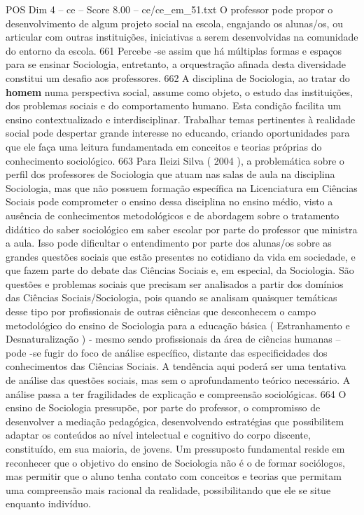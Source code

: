 \begin{textsample}{POS Dim 4 – ce – Score 8.00 – ce/ce\_em\_51.txt}
O professor pode propor o desenvolvimento de algum projeto social na escola, engajando os alunas/os, ou articular com outras instituições, iniciativas a serem desenvolvidas na comunidade do entorno da escola. 661 Percebe -se assim que há múltiplas formas e espaços para se ensinar Sociologia, entretanto, a orquestração afinada desta diversidade constitui um desafio aos professores. 662 A disciplina de Sociologia, ao tratar do \textbf{homem} numa perspectiva social, assume como objeto, o estudo das instituições, dos problemas sociais e do comportamento humano.
Esta condição facilita um ensino contextualizado e interdisciplinar.
Trabalhar temas pertinentes à realidade social pode despertar grande interesse no educando, criando oportunidades para que ele faça uma leitura fundamentada em conceitos e teorias próprias do conhecimento sociológico. 663 Para Ileizi Silva ( 2004 ), a problemática sobre o perfil dos professores de Sociologia que atuam nas salas de aula na disciplina Sociologia, mas que não possuem formação específica na Licenciatura em Ciências Sociais pode comprometer o ensino dessa disciplina no ensino médio, visto a ausência de conhecimentos metodológicos e de abordagem sobre o tratamento didático do saber sociológico em saber escolar por parte do professor que ministra a aula.
Isso pode dificultar o entendimento por parte dos alunas/os sobre as grandes questões sociais que estão presentes no cotidiano da vida em sociedade, e que fazem parte do debate das Ciências Sociais e, em especial, da Sociologia.
São questões e problemas sociais que precisam ser analisados a partir dos domínios das Ciências Sociais/Sociologia, pois quando se analisam quaisquer temáticas desse tipo por profissionais de outras ciências que desconhecem o campo metodológico do ensino de Sociologia para a educação básica ( Estranhamento e Desnaturalização ) - mesmo sendo profissionais da área de ciências humanas – pode -se fugir do foco de análise específico, distante das especificidades dos conhecimentos das Ciências Sociais.
A tendência aqui poderá ser uma tentativa de análise das questões sociais, mas sem o aprofundamento teórico necessário.
A análise passa a ter fragilidades de explicação e compreensão sociológicas. 664 O ensino de Sociologia pressupõe, por parte do professor, o compromisso de desenvolver a mediação pedagógica, desenvolvendo estratégias que possibilitem adaptar os conteúdos ao nível intelectual e cognitivo do corpo discente, constituído, em sua maioria, de jovens.
Um pressuposto fundamental reside em reconhecer que o objetivo do ensino de Sociologia não é o de formar sociólogos, mas permitir que o aluno tenha contato com conceitos e teorias que permitam uma compreensão mais racional da realidade, possibilitando que ele se situe enquanto indivíduo.

\end{textsample}
